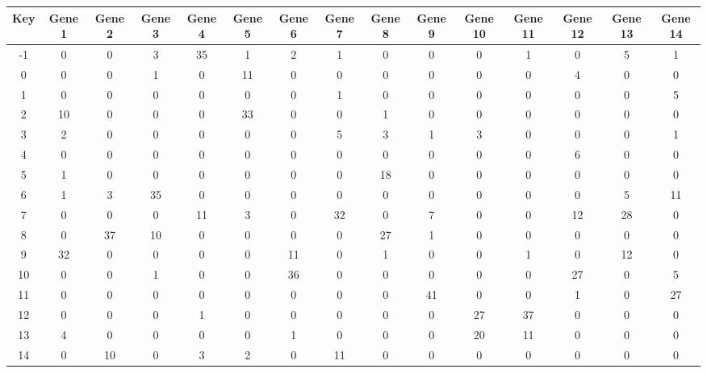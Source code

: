 \begin{tabular}{|c|c|c|c|c|c|c|c|c|c|c|c|c|c|c|}
\hline
Key & Gene 1 & Gene 2 & Gene 3 & Gene 4 & Gene 5 & Gene 6 & Gene 7 & Gene 8 & Gene 9 & Gene 10 & Gene 11 & Gene 12 & Gene 13 & Gene 14 \\
\hline
-1 & 0 & 0 & 3 & 35 & 1 & 2 & 1 & 0 & 0 & 0 & 1 & 0 & 5 & 1 \\
0 & 0 & 0 & 1 & 0 & 11 & 0 & 0 & 0 & 0 & 0 & 0 & 4 & 0 & 0 \\
1 & 0 & 0 & 0 & 0 & 0 & 0 & 1 & 0 & 0 & 0 & 0 & 0 & 0 & 5 \\
2 & 10 & 0 & 0 & 0 & 33 & 0 & 0 & 1 & 0 & 0 & 0 & 0 & 0 & 0 \\
3 & 2 & 0 & 0 & 0 & 0 & 0 & 5 & 3 & 1 & 3 & 0 & 0 & 0 & 1 \\
4 & 0 & 0 & 0 & 0 & 0 & 0 & 0 & 0 & 0 & 0 & 0 & 6 & 0 & 0 \\
5 & 1 & 0 & 0 & 0 & 0 & 0 & 0 & 18 & 0 & 0 & 0 & 0 & 0 & 0 \\
6 & 1 & 3 & 35 & 0 & 0 & 0 & 0 & 0 & 0 & 0 & 0 & 0 & 5 & 11 \\
7 & 0 & 0 & 0 & 11 & 3 & 0 & 32 & 0 & 7 & 0 & 0 & 12 & 28 & 0 \\
8 & 0 & 37 & 10 & 0 & 0 & 0 & 0 & 27 & 1 & 0 & 0 & 0 & 0 & 0 \\
9 & 32 & 0 & 0 & 0 & 0 & 11 & 0 & 1 & 0 & 0 & 1 & 0 & 12 & 0 \\
10 & 0 & 0 & 1 & 0 & 0 & 36 & 0 & 0 & 0 & 0 & 0 & 27 & 0 & 5 \\
11 & 0 & 0 & 0 & 0 & 0 & 0 & 0 & 0 & 41 & 0 & 0 & 1 & 0 & 27 \\
12 & 0 & 0 & 0 & 1 & 0 & 0 & 0 & 0 & 0 & 27 & 37 & 0 & 0 & 0 \\
13 & 4 & 0 & 0 & 0 & 0 & 1 & 0 & 0 & 0 & 20 & 11 & 0 & 0 & 0 \\
14 & 0 & 10 & 0 & 3 & 2 & 0 & 11 & 0 & 0 & 0 & 0 & 0 & 0 & 0 \\
\hline
\end{tabular}